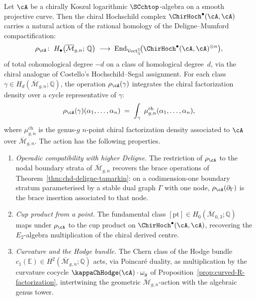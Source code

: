 \begin{proposition}
\label{prop:hochschild-mbar-action}
Let $\cA$ be a chirally Koszul logarithmic $\SCchtop$-algebra on a
smooth projective curve. Then the chiral Hochschild complex
$\ChirHoch^\bullet(\cA,\cA)$ carries a natural action of the
rational homology of the Deligne--Mumford compactification:
\begin{equation}\label{eq:hochschild-mbar-action}
\rho_{\cA}\colon\; H_\bullet\bigl(\overline{\mathcal{M}}_{g,n};\,
\mathbb{Q}\bigr) \;\longrightarrow\;
\mathrm{End}_{\mathrm{Vect}_\mathbb{Q}^{\mathbb{Z}}}\!\bigl(
\ChirHoch^\bullet(\cA,\cA)^{\otimes n}\bigr),
\end{equation}
of total cohomological degree $-d$ on a class of homological
degree~$d$, via the chiral analogue of Costello's Hochschild--Segal
assignment. For each class $\gamma \in
H_d(\overline{\mathcal{M}}_{g,n};\mathbb{Q})$, the operation
$\rho_\cA(\gamma)$ integrates the chiral factorization density over
a cycle representative of $\gamma$:
\[
\rho_\cA(\gamma)(\alpha_1,\dots,\alpha_n)
\;=\; \int_{\gamma}\; \mu^{\mathrm{ch}}_{g,n}(\alpha_1,\dots,\alpha_n),
\]
where $\mu^{\mathrm{ch}}_{g,n}$ is the genus-$g$ $n$-point chiral
factorization density associated to $\cA$ over
$\overline{\mathcal{M}}_{g,n}$. The action has the following
properties.
\begin{enumerate}[label=\textup{(\roman*)}]
\item \emph{Operadic compatibility with higher Deligne.}
 The restriction of $\rho_\cA$ to the nodal boundary strata of
 $\overline{\mathcal{M}}_{g,n}$ recovers the brace operations of
 Theorem~\textup{\ref{thm:chd-deligne-tamarkin}}: on a codimension-one
 boundary stratum parameterised by a stable dual graph $\Gamma$ with
 one node, $\rho_\cA(\partial_\Gamma)$ is the brace insertion
 associated to that node.
\item \emph{Cup product from a point.}
 The fundamental class $[\mathrm{pt}] \in
 H_0(\overline{\mathcal{M}}_{0,3};\mathbb{Q})$ maps under $\rho_\cA$
 to the cup product on $\ChirHoch^\bullet(\cA,\cA)$, recovering the
 $E_2$-algebra multiplication of the chiral derived centre.
\item \emph{Curvature and the Hodge bundle.}
 The Chern class of the Hodge bundle
 $c_1(\mathbb{E}) \in H^2(\overline{\mathcal{M}}_{g,n};\mathbb{Q})$
 acts, via Poincar\'e duality, as multiplication by the curvature
 cocycle $\kappaChHodge(\cA)\cdot\omega_g$ of
 Proposition~\textup{\ref{prop:curved-R-factorization}}, intertwining
 the geometric $\overline{\mathcal{M}}_{g,n}$-action with the
 algebraic genus tower.
\end{enumerate}
\end{proposition}

